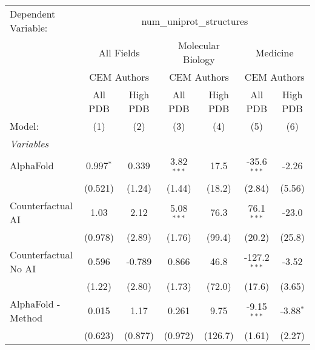 \begingroup
\centering
\begin{tabular}{lcccccc}
   \tabularnewline \midrule \midrule
   Dependent Variable: & \multicolumn{6}{c}{num\_uniprot\_structures}\\
 & \multicolumn{2}{c}{All Fields} & \multicolumn{2}{c}{Molecular Biology} & \multicolumn{2}{c}{Medicine} \\
\cmidrule(lr){2-3} \cmidrule(lr){4-5} \cmidrule(lr){6-7}
 & \multicolumn{2}{c}{CEM Authors} & \multicolumn{2}{c}{CEM Authors} & \multicolumn{2}{c}{CEM Authors} \\
\cmidrule(lr){2-3} \cmidrule(lr){4-5} \cmidrule(lr){6-7}
 & \multicolumn{1}{c}{All PDB} & \multicolumn{1}{c}{High PDB} & \multicolumn{1}{c}{All PDB} & \multicolumn{1}{c}{High PDB} & \multicolumn{1}{c}{All PDB} & \multicolumn{1}{c}{High PDB} \\
\cmidrule(lr){2-2} \cmidrule(lr){3-3} \cmidrule(lr){4-4} \cmidrule(lr){5-5} \cmidrule(lr){6-6} \cmidrule(lr){7-7}
   Model:                                                     & (1)          & (2)     & (3)          & (4)     & (5)            & (6)\\  
   \midrule
   \emph{Variables}\\
   AlphaFold                                                  & 0.997$^{*}$  & 0.339   & 3.82$^{***}$ & 17.5    & -35.6$^{***}$  & -2.26\\   
                                                              & (0.521)      & (1.24)  & (1.44)       & (18.2)  & (2.84)         & (5.56)\\   
   Counterfactual AI                                          & 1.03         & 2.12    & 5.08$^{***}$ & 76.3    & 76.1$^{***}$   & -23.0\\   
                                                              & (0.978)      & (2.89)  & (1.76)       & (99.4)  & (20.2)         & (25.8)\\   
   Counterfactual No AI                                       & 0.596        & -0.789  & 0.866        & 46.8    & -127.2$^{***}$ & -3.52\\   
                                                              & (1.22)       & (2.80)  & (1.73)       & (72.0)  & (17.6)         & (3.65)\\   
   AlphaFold - Method                                         & 0.015        & 1.17    & 0.261        & 9.75    & -9.15$^{***}$  & -3.88$^{*}$\\   
                                                              & (0.623)      & (0.877) & (0.972)      & (126.7) & (1.61)         & (2.27)\\   

\end{tabular}
